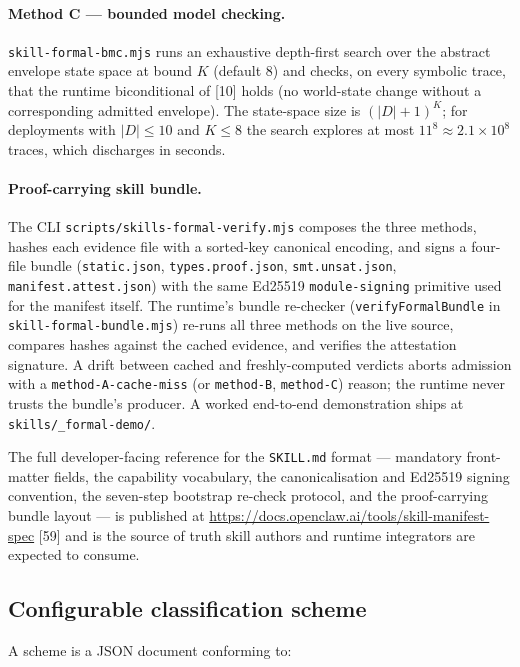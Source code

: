 \documentclass[11pt]{article}
\begin{document}
\paragraph{Method C --- bounded model checking.}
\texttt{skill-formal-bmc.mjs} runs an exhaustive depth-first search
over the abstract envelope state space at bound $K$ (default 8) and
checks, on every symbolic trace, that the runtime biconditional of
[10] holds (no world-state change without a corresponding admitted
envelope). The state-space size is
$(\lvert D \rvert + 1)^{K}$; for deployments with
$\lvert D \rvert \le 10$ and $K \le 8$ the search explores at most
$11^{8} \approx 2.1 \times 10^{8}$ traces, which discharges in
seconds.

\paragraph{Proof-carrying skill bundle.} The CLI
\texttt{scripts/skills-formal-verify.mjs} composes the three methods,
hashes each evidence file with a sorted-key canonical encoding, and
signs a four-file bundle (\texttt{static.json}, \texttt{types.proof.json},
\texttt{smt.unsat.json}, \texttt{manifest.attest.json}) with the same
Ed25519 \texttt{module-signing} primitive used for the manifest itself.
The runtime's bundle re-checker
(\texttt{verifyFormalBundle} in \texttt{skill-formal-bundle.mjs})
re-runs all three methods on the live source, compares hashes against
the cached evidence, and verifies the attestation signature. A drift
between cached and freshly-computed verdicts aborts admission with a
\texttt{method-A-cache-miss} (or \texttt{method-B}, \texttt{method-C})
reason; the runtime never trusts the bundle's producer. A worked
end-to-end demonstration ships at \texttt{skills/\_formal-demo/}.

The full developer-facing reference for the \texttt{SKILL.md} format
--- mandatory front-matter fields, the capability vocabulary, the
canonicalisation and Ed25519 signing convention, the seven-step
bootstrap re-check protocol, and the proof-carrying bundle layout
--- is published at
\url{https://docs.openclaw.ai/tools/skill-manifest-spec} [59] and
is the source of truth skill authors and runtime integrators are
expected to consume.

\subsection{Configurable classification scheme}

A scheme is a JSON document conforming to:
\end{document}
